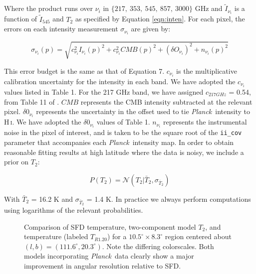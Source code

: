 \documentclass{emulateapj}
\newcommand{\PLANCK}{{\it Planck}}
\begin{document}

Where the product runs over $\nu_i$ in $\{217,\ 353,\ 545,\ 857,\ 3000\}$ GHz
and $\tilde{I}_{\nu_i}$ is a function of $\tilde{I}_{545}$ and $T_2$ as 
specified by Equation \ref{eqn:inten}. For each pixel, the errors on each 
intensity measurement $\sigma_{\nu_i}$ are given by:

\begin{equation}
\sigma_{\nu_i}(p) = \sqrt{c^2_{\nu_i}I_{\nu_i}(p)^2 + c^2_{\nu_i}CMB(p)^2 + (\delta O_{\nu_i})^2 + n_{\nu_i}(p)^2}
\end{equation}


This error budget is the same as that of \cite{planckdust} Equation 7. 
$c_{\nu_i}$ is the multiplicative calibration uncertainty for the intensity in 
each band. We have adopted the $c_{\nu_i}$ values listed in \cite{planckdust} 
Table 1. For the 217 GHz band, we have assigned $c_{217 GHz}$ = 0.54, from 
Table 11 of \cite{planckcalib}. $CMB$ represents the CMB intensity 
subtracted at the relevant pixel. $\delta0_{\nu_i}$ represents the uncertainty
in the offset used to tie \PLANCK~intensity to H\,\textsc{i}. We have adopted 
the  $\delta0_{\nu_i}$ values of \cite{planckdust} Table 1. $n_{\nu_i}$ 
represents the instrumental noise in the pixel of interest, and is taken to be 
the square root of the \verb|ii_cov| parameter that accompanies each 
\PLANCK~intensity map. In order to obtain reasonable fitting results at high 
latitude where the data is noisy, we include a prior on $T_2$:


\begin{equation}
P(T_2) = \mathcal{N}(T_2|\bar{T}_2, \sigma_{\bar{T}_2})
\end{equation}


With $\bar{T}_2$ = 16.2 K and $\sigma_{\bar{T}_2}$ = 1.4 K. In practice we 
always perform computations using logarithms of the relevant probabilities.

\begin{figure}
\begin{center}
\caption{\label{fig:comparison} Comparison of SFD temperature, two-component 
model $T_2$, and \cite{planckdust} temperature (labeled $T_{R1.20}$) for a
 $10.5^{\circ}\times8.3^{\circ}$  region centered about 
$(l,b) = (111.6^{\circ}, 20.3^{\circ})$. Note the differing colorscales. Both 
models incorporating \PLANCK~data clearly show a major improvement in angular 
resolution relative to SFD.}
\end{center}
\end{figure}
\end{document}
